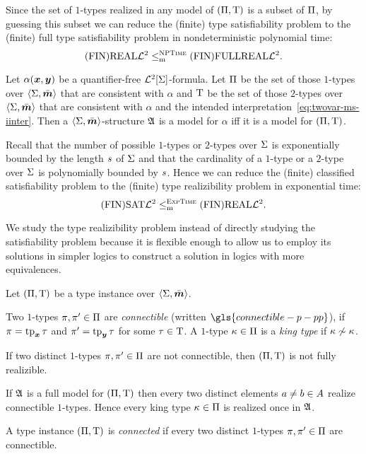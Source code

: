 \begin{remark}
Since the set of $1$-types realized in any model of $(\Pi,\mathrm{T})$ is a subset
of $\Pi$, by guessing this subset we can reduce the (finite) type
satisfiability problem to the (finite) full type satisfiability problem in
nondeterministic polynomial time:
\[
  \mathrm{(FIN)REAL}\mathcal{L}^{2} \leq_{\mathrm{m}}^{\text{\normalfont{\scshape NPTime}}} \mathrm{(FIN)FULLREAL}\mathcal{L}^{2}.
\]
\end{remark}

\begin{remark}
Let $\alpha(\bm{x},\bm{y})$ be a quantifier-free $\mathcal{L}^{2}[\mathrm{\Sigma}]$-formula. Let $\Pi$ be
the set of those $1$-types over $\left\langle \mathrm{\Sigma},\bar{\bm{m}} \right\rangle$ that are consistent with
$\alpha$ and $\mathrm{T}$ be the set of those $2$-types over $\left\langle \mathrm{\Sigma},\bar{\bm{m}} \right\rangle$ that
are consistent with $\alpha$ and the intended
interpretation~\cref{eq:twovar-ms-iinter}. Then a $\left\langle \mathrm{\Sigma},\bar{\bm{m}} \right\rangle$-structure
$\mathfrak{A}$ is a model for $\alpha$ iff it is a model for $(\Pi,\mathrm{T})$.

Recall that the number of possible $1$-types or $2$-types over $\mathrm{\Sigma}$ is
exponentially bounded by the length $s$ of $\mathrm{\Sigma}$ and that the cardinality
of a $1$-type or a $2$-type over $\mathrm{\Sigma}$ is polynomially bounded by $s$.
Hence we can reduce the (finite) classified satisfiability problem to the
(finite) type realizibility problem in exponential time:
\[
  \mathrm{(FIN)SAT}\mathcal{L}^{2} \leq_{\mathrm{m}}^{\text{\normalfont{\scshape ExpTime}}} \mathrm{(FIN)REAL}\mathcal{L}^{2}.
\]
\end{remark}

We study the type realizibility problem instead of directly studying the
satisfiability problem because it is flexible enough to allow us to employ its
solutions in simpler logics to construct a solution in logics with more
equivalences.

Let $(\Pi,\mathrm{T})$ be a type instance over $\left\langle \mathrm{\Sigma},\bar{\bm{m}} \right\rangle$.
\begin{definition}
Two $1$-types $\pi, {\pi'} \in \Pi$ are \emph{connectible} (written
$\gls{connectible-p-pp}$), if $\pi = \operatorname{tp}_{\bm{x}}\tau$ and ${\pi'} = \operatorname{tp}_{\bm{y}}\tau$ for
some $\tau \in \mathrm{T}$. A $1$-type $\kappa \in \Pi$ is a \emph{king type} if
$\kappa \not\sim \kappa$.
\end{definition}
\begin{remark}\label{rem:twovar-king-once}
If two distinct $1$-types $\pi, {\pi'} \in \Pi$ are not connectible, then
$(\Pi,\mathrm{T})$ is not fully realizible.

If $\mathfrak{A}$ is a full model for $(\Pi,\mathrm{T})$ then every two distinct elements
$a \neq b \in A$ realize connectible $1$-types. Hence every king type
$\kappa \in \Pi$ is realized once in $\mathfrak{A}$.

A type instance $(\Pi,\mathrm{T})$ is \emph{connected} if every two distinct
$1$-types $\pi, {\pi'} \in \Pi$ are connectible.
\end{remark}

